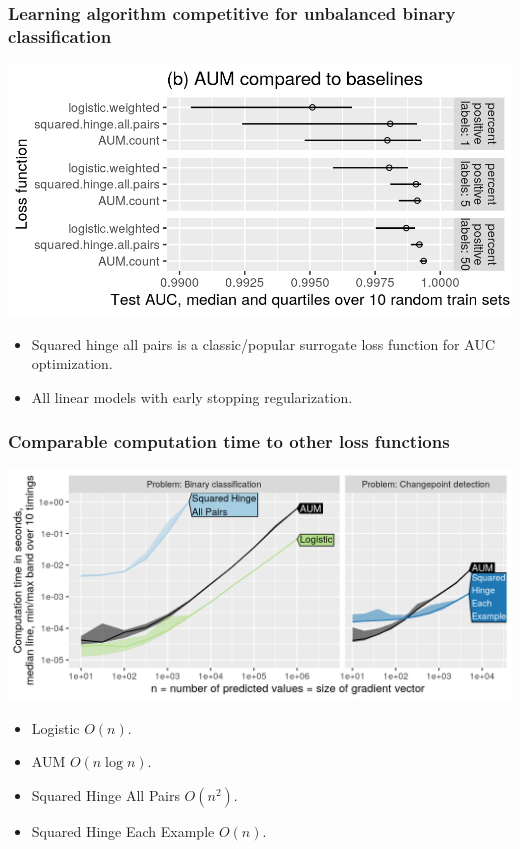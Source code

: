 \documentclass{beamer}
\begin{document}
\begin{frame}
  \frametitle{Learning algorithm competitive for unbalanced binary classification}

 \includegraphics[width=\textwidth]{figure-unbalanced-grad-desc.png}

 \begin{itemize}
 \item Squared hinge all pairs is a classic/popular surrogate loss function
   for AUC optimization.
 \item All linear models with early stopping regularization.
 \end{itemize}

\end{frame}

\begin{frame}
  \frametitle{Comparable computation time to other loss functions}

\includegraphics[width=\textwidth]{figure-aum-grad-speed-both.png}

\begin{itemize}
\item Logistic $O(n)$.
\item AUM $O(n\log n)$.
\item Squared Hinge All Pairs $O(n^2)$.
\item Squared Hinge Each Example $O(n)$.
\end{itemize}
  
\end{frame}
\end{document}
